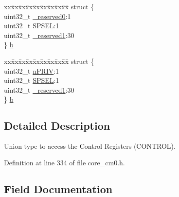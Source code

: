 \begin{DoxyCompactItemize}
\begin{tabbing}
\end{tabbing}\item 
\begin{tabbing}
xx\=xx\=xx\=xx\=xx\=xx\=xx\=xx\=xx\=\kill
struct \{\\
\>uint32\_t \hyperlink{union_c_o_n_t_r_o_l___type_ac8a6a13838a897c8d0b8bc991bbaf7c1}{\_reserved0}:1\\
\>uint32\_t \hyperlink{union_c_o_n_t_r_o_l___type_ae185aac93686ffc78e998a9daf41415b}{SPSEL}:1\\
\>uint32\_t \hyperlink{union_c_o_n_t_r_o_l___type_a959a73d8faee56599b7e792a7c5a2d16}{\_reserved1}:30\\
\} \hyperlink{union_c_o_n_t_r_o_l___type_a1aaf2022b762ebb6bdec99768b905056}{b}\\

\end{tabbing}\item 
\begin{tabbing}
xx\=xx\=xx\=xx\=xx\=xx\=xx\=xx\=xx\=\kill
struct \{\\
\>uint32\_t \hyperlink{union_c_o_n_t_r_o_l___type_a2a6e513e8a6bf4e58db169e312172332}{nPRIV}:1\\
\>uint32\_t \hyperlink{union_c_o_n_t_r_o_l___type_ae185aac93686ffc78e998a9daf41415b}{SPSEL}:1\\
\>uint32\_t \hyperlink{union_c_o_n_t_r_o_l___type_a959a73d8faee56599b7e792a7c5a2d16}{\_reserved1}:30\\
\} \hyperlink{union_c_o_n_t_r_o_l___type_ab0197b08e3cf49a0171c6bdfa2178593}{b}\\

\end{tabbing}\end{DoxyCompactItemize}


\subsection{Detailed Description}
Union type to access the Control Registers (C\+O\+N\+T\+R\+OL). 

Definition at line 334 of file core\+\_\+cm0.\+h.



\subsection{Field Documentation}
